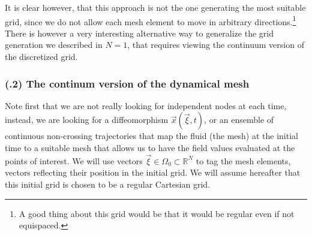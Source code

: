 \documentclass[11pt, a4paper]{article} %
\newcommand{\R}{\mathbb{R}} %
\begin{document}
It is clear however, that this approach is not the one generating the most suitable grid, since we do not allow each mesh element to move in arbitrary directions.\footnote{ A good thing about this grid would be that it would be regular even if not equispaced.} There is however a very interesting alternative way to generalize the grid generation we described in $N=1$, that requires viewing the continuum version of the discretized grid.


\subsubsection*{(\textgamma.2) The continum version of the dynamical mesh}
Note first that we are not really looking for independent nodes at each time, instead, we are looking for a diffeomorphism $\vec{x}(\vec{\xi},t)$, or an ensemble of continuous non-crossing trajectories that map the fluid (the mesh) at the initial time to a suitable mesh that allows us to have the field values evaluated at the points of interest. We will use vectors $\vec{\xi}\in\Omega_0\subset\R^N$ to tag the mesh elements, vectors reflecting their position in the initial grid. We will assume hereafter that this initial grid is chosen to be a regular Cartesian grid.
\end{document}
